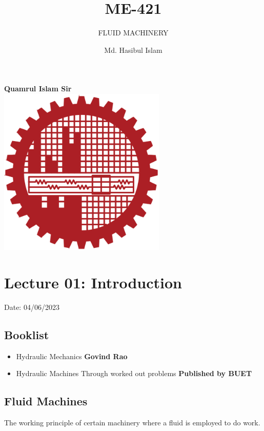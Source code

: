 \documentclass{article}
\title{ME-421}
\author{Md. Hasibul Islam}
\subtitle{FLUID MACHINERY}
\begin{document}
\begin{titlepage}
    \centering
    
    {\Huge\bfseries\maketitle}
    \textbf{Quamrul Islam Sir} \\
    \vspace{2cm}
    \includegraphics[width=8cm]{institution_logo.jpg}
    \vfill
    \vspace*{2cm}
\end{titlepage}

\tableofcontents
\pagebreak
\section{Lecture 01: Introduction} 
\hfill Date: 04/06/2023

\subsection*{Booklist}

\begin{itemize}
    \item Hydraulic Mechanics \hfill \textbf{Govind Rao}
    \item Hydraulic Machines Through worked out problems \hfill \textbf{Published by BUET}
\end{itemize}


\subsection*{Fluid Machines}
The working principle of certain machinery where a fluid is employed to do work.
\end{document}
